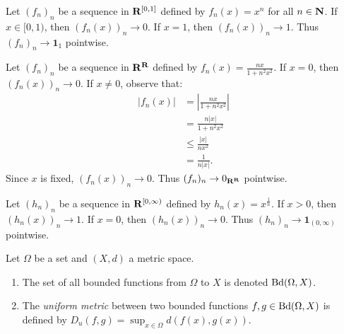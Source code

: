 \documentclass[11pt,twoside,openany]{memoir}
\begin{document}
    \begin{example}
        Let $(f_n)_n$ be a sequence in $\mathbf{R}^{[0,1]}$ defined by $f_n(x) = x^n$ for all $n \in \mathbf{N}$. If $x \in [0,1)$, then $(f_n(x))_n \rightarrow 0$. If $x = 1$, then $(f_n(x))_n \rightarrow 1$. Thus $(f_n)_n \rightarrow \mathbf{1}_{1}$ pointwise.
    \end{example}

    \begin{example}
        Let $(f_n)_n$ be a sequence in $\mathbf{R}^{\mathbf{R}}$ defined by $f_n(x) = \frac{nx}{1 + n^2x^2}$. If $x = 0$, then $(f_n(x))_n \rightarrow 0$. If $x \neq 0$, observe that:
            \begin{equation*}
            \begin{split}
                |f_n(x)|
                & = \left| \frac{nx}{1 + n^2 x^2} \right| \\
                & = \frac{n |x|}{1 + n^2 x^2} \\ 
                & \leq \frac{|x|}{nx^2} \\
                & = \frac{1}{n|x|}.
            \end{split}
            \end{equation*}
        Since $x$ is fixed, $(f_n(x))_n \rightarrow 0$. Thus $(f_n)_n \rightarrow 0_{\mathbf{R}^{\mathbf{R}}}$ pointwise.
    \end{example}

    \begin{example}
        Let $(h_n)_n$ be a sequence in $\mathbf{R}^{[0,\infty)}$ defined by $h_n(x) = x^{\frac{1}{n}}$. If $x > 0$, then $(h_n(x))_n \rightarrow 1$. If $x = 0$, then $(h_n(x))_n \rightarrow 0$. Thus $(h_n)_n \rightarrow \mathbf{1}_{(0,\infty)}$ pointwise.
    \end{example}

    \begin{definition}
        Let $\Omega$ be a set and $(X,d)$ a metric space.
        \begin{enumerate}[label = (\arabic*),itemsep=1pt,topsep=3pt]
            \item The set of all bounded functions from $\Omega$ to $X$ is denoted $\operatorname{Bd}(\Omega,X)$.
            \item The \textit{uniform metric} between two bounded functions $f,g \in \operatorname{Bd}(\Omega,X)$ is defined by $D_u(f,g) = \sup_{x \in \Omega}d(f(x),g(x))$.
        \end{enumerate}
    \end{definition}
\end{document}
